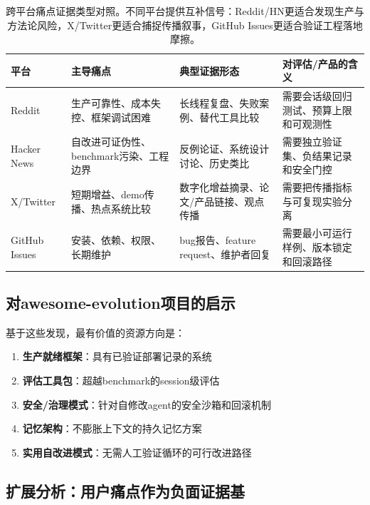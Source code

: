 \begin{table}[htbp]
\centering
\small
\begin{tabular}{p{30mm}p{34mm}p{38mm}p{38mm}}
\toprule
\textbf{平台} & \textbf{主导痛点} & \textbf{典型证据形态} & \textbf{对评估/产品的含义} \\
\midrule
Reddit & 生产可靠性、成本失控、框架调试困难 & 长线程复盘、失败案例、替代工具比较 & 需要会话级回归测试、预算上限和可观测性 \\
Hacker News & 自改进可证伪性、benchmark污染、工程边界 & 反例论证、系统设计讨论、历史类比 & 需要独立验证集、负结果记录和安全门控 \\
X/Twitter & 短期增益、demo传播、热点系统比较 & 数字化增益摘录、论文/产品链接、观点传播 & 需要把传播指标与可复现实验分离 \\
GitHub Issues & 安装、依赖、权限、长期维护 & bug报告、feature request、维护者回复 & 需要最小可运行样例、版本锁定和回滚路径 \\
\bottomrule
\end{tabular}
\caption{跨平台痛点证据类型对照。不同平台提供互补信号：Reddit/HN更适合发现生产与方法论风险，X/Twitter更适合捕捉传播叙事，GitHub Issues更适合验证工程落地摩擦。}
\label{tab:ch7-platform-evidence}
\end{table}

\subsection{对awesome-evolution项目的启示}

基于这些发现，最有价值的资源方向是：

\begin{enumerate}[nosep]
\item \textbf{生产就绪框架}：具有已验证部署记录的系统
\item \textbf{评估工具包}：超越benchmark的session级评估
\item \textbf{安全/治理模式}：针对自修改agent的安全沙箱和回滚机制
\item \textbf{记忆架构}：不膨胀上下文的持久记忆方案
\item \textbf{实用自改进模式}：无需人工验证循环的可行改进路径
\end{enumerate}


\subsection{扩展分析：用户痛点作为负面证据基}
\label{sec:ch7-english-recovery}

